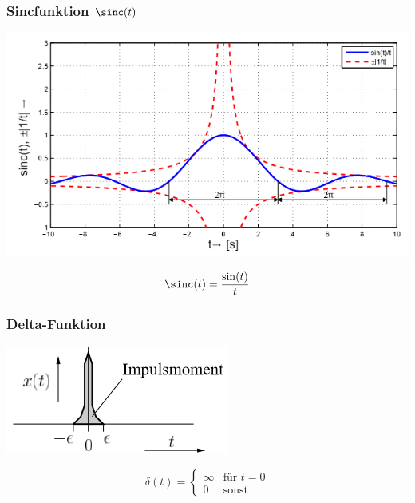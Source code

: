 \subsubsection{Sincfunktion $\sinc(t)$}
\begin{center}
	\begin{minipage}{0.2\textwidth}
		\includegraphics[width=\linewidth,keepaspectratio=true]{Images/sinc}
	\end{minipage}%
	\begin{minipage}{0.2\textwidth}
		\[\sinc(t) = \frac{\sin(t)}{t}\]
	\end{minipage}
\end{center}

\subsubsection{Delta-Funktion}
\begin{center}
	\begin{minipage}{0.2\textwidth}
		\includegraphics[width=\linewidth,keepaspectratio=true]{Images/dirac}
	\end{minipage}%
	\begin{minipage}{0.2\textwidth}
		\[\delta(t) = \begin{cases*}
			\infty & \text{für } t = 0 \\
			0 & \text{sonst}
		\end{cases*}\]
	\end{minipage}
\end{center}

